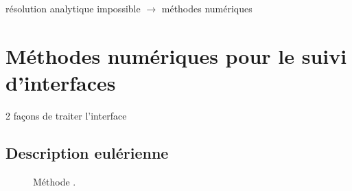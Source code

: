 

\par
résolution analytique impossible $\to$ méthodes numériques

\section{Méthodes numériques pour le suivi d'interfaces}
2 façons de traiter l'interface
\subsection{Description eulérienne}
\begin{figure}
	\centering
%	
	\caption{Méthode .}
	\label{fig:levelset}
\end{figure}

